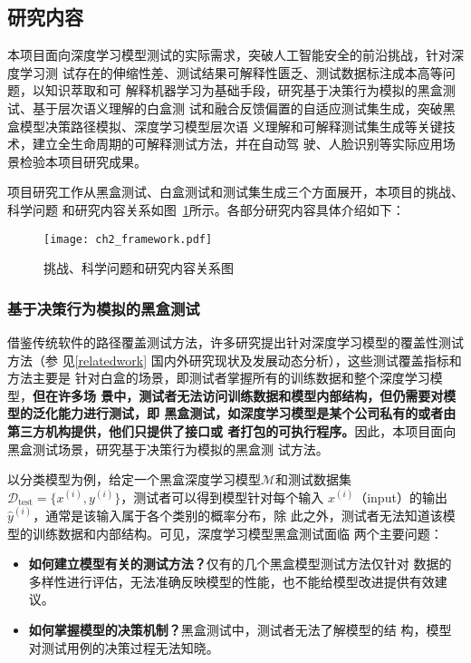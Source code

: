 \subsection{研究内容}\label{ch2content}

本项目面向深度学习模型测试的实际需求，突破人工智能安全的前沿挑战，针对深度学习测
试存在的伸缩性差、测试结果可解释性匮乏、测试数据标注成本高等问题，以知识萃取和可
解释机器学习为基础手段，研究基于决策行为模拟的黑盒测试、基于层次语义理解的白盒测
试和融合反馈偏置的自适应测试集生成，突破黑盒模型决策路径模拟、深度学习模型层次语
义理解和可解释测试集生成等关键技术，建立全生命周期的可解释测试方法，并在自动驾
驶、人脸识别等实际应用场景检验本项目研究成果。


项目研究工作从黑盒测试、白盒测试和测试集生成三个方面展开，本项目的挑战、科学问题
和研究内容关系如图~\ref{fig:ch2:rc}所示。各部分研究内容具体介绍如下：

\begin{figure}[htp]
    \begin{small}
        \begin{center}
            \texttt{[image: ch2\_framework.pdf]}
        \end{center}
        \caption{挑战、科学问题和研究内容关系图}
        \label{fig:ch2:rc}
    \end{small}
\end{figure}

\subsubsection{基于决策行为模拟的黑盒测试}

借鉴传统软件的路径覆盖测试方法，许多研究提出针对深度学习模型的覆盖性测试方法（参
见\ref{relatedwork} 国内外研究现状及发展动态分析），这些测试覆盖指标和方法主要是
针对白盒的场景，即测试者掌握所有的训练数据和整个深度学习模型，\textbf{但在许多场
景中，测试者无法访问训练数据和模型内部结构，但仍需要对模型的泛化能力进行测试，即
黑盒测试，如深度学习模型是某个公司私有的或者由第三方机构提供，他们只提供了接口或
者打包的可执行程序。}因此，本项目面向黑盒测试场景，研究基于决策行为模拟的黑盒测
试方法。

以分类模型为例，给定一个黑盒深度学习模型$\mathcal M$和测试数据集$\mathcal
D_{\text{test}}=\{x^{(i)},y^{(i)}\}$，测试者可以得到模型针对每个输入
$x^{(i)}$（input）的输出$\hat{y}^{(i)}$，通常是该输入属于各个类别的概率分布，除
此之外，测试者无法知道该模型的训练数据和内部结构。可见，深度学习模型黑盒测试面临
两个主要问题：
\begin{itemize}
    \item \textbf{如何建立模型有关的测试方法？}仅有的几个黑盒模型测试方法仅针对
    数据的多样性进行评估，无法准确反映模型的性能，也不能给模型改进提供有效建议。
    \item \textbf{如何掌握模型的决策机制？}黑盒测试中，测试者无法了解模型的结
    构，模型对测试用例的决策过程无法知晓。
\end{itemize}

